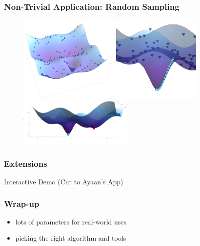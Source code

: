 \documentclass{beamer}
\begin{document}
\begin{frame}
\frametitle{Non-Trivial Application: Random Sampling}

   

\begin{figure}
\includegraphics[height=4.2cm]{samples}
\includegraphics[height=4.2cm]{samples_detail}
\includegraphics[height=2.4cm]{two_mins}
\end{figure}

\end{frame}

\begin{frame}
\frametitle{Extensions}

Interactive Demo (Cut to Ayaan's App)

\end{frame}

\begin{frame}
\frametitle{Wrap-up}



\begin{itemize}
    \item lots of parameters for real-world uses
    \item picking the right algorithm and tools
\end{itemize}

\end{frame}
\end{document}
